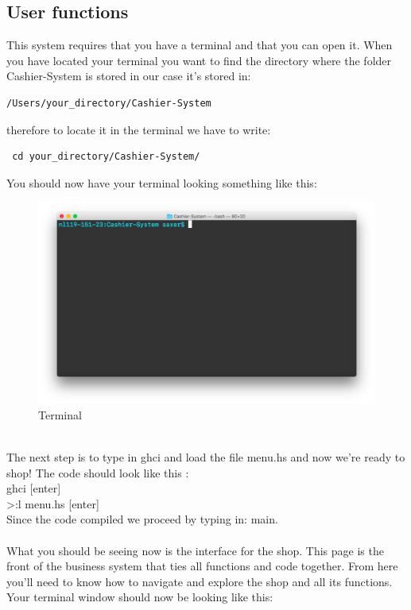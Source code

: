 \documentclass[11pt]{article}
\begin{document}
\subsection{User functions}
This system requires that you have a terminal and that you can open it. When you have located your terminal you want to find the directory where the folder Cashier-System is stored in our case it’s stored in:
\begin{lstlisting}
/Users/your_directory/Cashier-System
\end{lstlisting}
 therefore to locate it in the terminal we have to write:
\begin{lstlisting}
 cd your_directory/Cashier-System/
\end{lstlisting}
You should now have your terminal looking something like this:
\\
\begin{figure}[h]
  \includegraphics[width=\linewidth]{interface1.png}
  \caption{Terminal}
  \label{fig:Terminal}
\end{figure}
\\
\newpage
The next step is to type in ghci and load the file menu.hs and now we’re ready to shop! The code should look like this :\\
ghci [enter]\\
>:l menu.hs [enter]\\
Since the code compiled we proceed by typing in: main.\\\\
What you should be seeing now is the interface for the shop. This page is the front of the business system that ties all functions and code together. From here you’ll need to know how to navigate and explore the shop and all its functions. Your terminal window should now be looking like this:
\\
\end{document}

